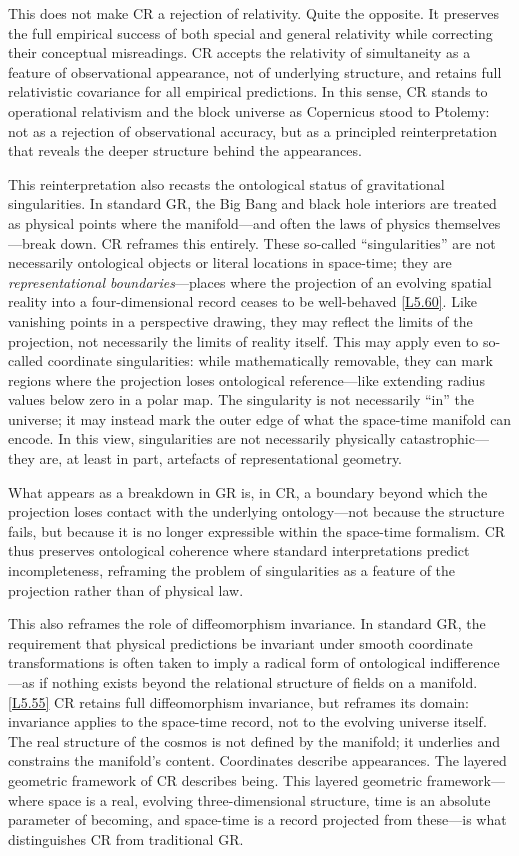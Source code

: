 \documentclass[12pt]{book}
\newcounter{logicanchor}
\newenvironment{logicanchorenv}[1]{\refstepcounter{logicanchor}\label{#1}}{}
\newcommand{\logiclink}[2]{\begin{logicanchorenv}{logic:#1}\end{logicanchorenv}\hyperref[appendix:#1]{[#1]}\xspace}
\begin{document}
This does not make CR a rejection of relativity. Quite the opposite. It preserves the full empirical success of both special and general relativity while correcting their conceptual misreadings. CR accepts the relativity of simultaneity as a feature of observational appearance, not of underlying structure, and retains full relativistic covariance for all empirical predictions. In this sense, CR stands to operational relativism and the block universe as Copernicus stood to Ptolemy: not as a rejection of observational accuracy, but as a principled reinterpretation that reveals the deeper structure behind the appearances.

This reinterpretation also recasts the ontological status of gravitational singularities. In standard GR, the Big Bang and black hole interiors are treated as physical points where the manifold---and often the laws of physics themselves---break down. CR reframes this entirely. These so-called ``singularities'' are not necessarily ontological objects or literal locations in space-time; they are \textit{representational boundaries}---places where the projection of an evolving spatial reality into a four-dimensional record ceases to be well-behaved \logiclink{L5.60}{}. Like vanishing points in a perspective drawing, they may reflect the limits of the projection, not necessarily the limits of reality itself. This may apply even to so-called coordinate singularities: while mathematically removable, they can mark regions where the projection loses ontological reference---like extending radius values below zero in a polar map. The singularity is not necessarily ``in'' the universe; it may instead mark the outer edge of what the space-time manifold can encode. In this view, singularities are not necessarily physically catastrophic---they are, at least in part, artefacts of representational geometry.

What appears as a breakdown in GR is, in CR, a boundary beyond which the projection loses contact with the underlying ontology---not because the structure fails, but because it is no longer expressible within the space-time formalism. CR thus preserves ontological coherence where standard interpretations predict incompleteness, reframing the problem of singularities as a feature of the projection rather than of physical law.

This also reframes the role of diffeomorphism invariance. In standard GR, the requirement that physical predictions be invariant under smooth coordinate transformations is often taken to imply a radical form of ontological indifference---as if nothing exists beyond the relational structure of fields on a manifold. \logiclink{L5.55}{} CR retains full diffeomorphism invariance, but reframes its domain: invariance applies to the space-time record, not to the evolving universe itself. The real structure of the cosmos is not defined by the manifold; it underlies and constrains the manifold's content. Coordinates describe appearances. The layered geometric framework of CR describes being. This layered geometric framework---where space is a real, evolving three-dimensional structure, time is an absolute parameter of becoming, and space-time is a record projected from these---is what distinguishes CR from traditional GR.
\end{document}
